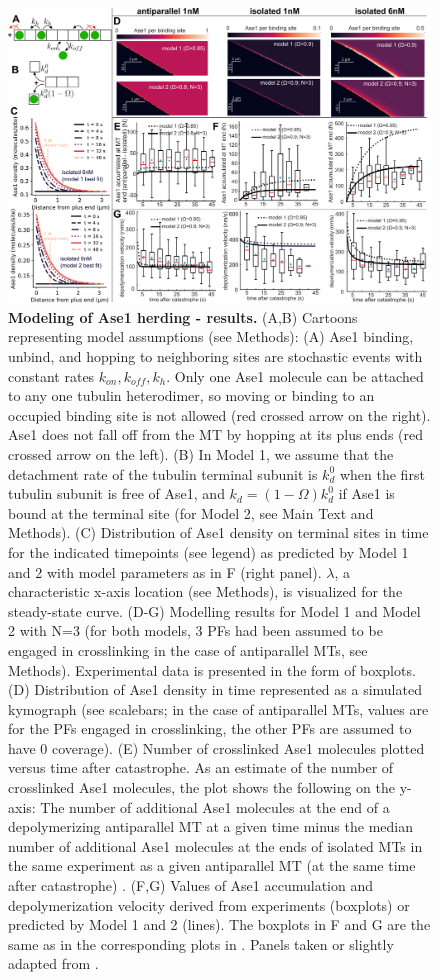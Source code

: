 \begin{figure}[h!]
    \centering
    \includegraphics[width=1\linewidth]{Figures/ase2d.png}
    \caption[Modeling of Ase1 herding - results.]{\textbf{Modeling of Ase1 herding - results.}
    (A,B) Cartoons representing model assumptions (see Methods): (A) Ase1 binding, unbind, and hopping to neighboring sites are stochastic events with constant rates $k_{on},k_{off},k_h$. Only one Ase1 molecule can be attached to any one tubulin heterodimer, so moving or binding to an occupied binding site is not allowed (red crossed arrow on the right). Ase1 does not fall off from the MT by hopping at its plus ends (red crossed arrow on the left). (B) In Model 1, we assume that the detachment rate of the tubulin terminal subunit is $k_d^0$ when the first tubulin subunit is free of Ase1, and $k_d=(1-\Omega)k_d^0$ if Ase1 is bound at the terminal site (for Model 2, see Main Text and Methods). (C) Distribution of Ase1 density on terminal sites in time for the indicated timepoints (see legend) as predicted by Model 1 and 2 with model parameters as in F (right panel). $\lambda$, a characteristic x-axis location (see Methods), is visualized for the steady-state curve. (D-G) Modelling results for Model 1 and Model 2 with N=3 (for both models, 3 PFs had been assumed to be engaged in crosslinking in the case of antiparallel MTs, see Methods). Experimental data is presented in the form of boxplots. (D) Distribution of Ase1 density in time represented as a simulated kymograph (see scalebars; in the case of antiparallel MTs, values are for the PFs engaged in crosslinking, the other PFs are assumed to have 0 coverage). (E) Number of crosslinked Ase1 molecules plotted versus time after catastrophe. As an estimate of the number of crosslinked Ase1 molecules, the plot shows the following on the y-axis: The number of additional Ase1 molecules at the end of a depolymerizing antiparallel MT at a given time  minus the median number of additional Ase1 molecules at the ends of isolated MTs in the same experiment as a given antiparallel MT (at the same time after catastrophe) . (F,G) Values of Ase1 accumulation and depolymerization velocity derived from experiments (boxplots) or predicted by Model 1 and 2 (lines). The boxplots in F and G are the same as in the corresponding plots in . Panels taken or slightly adapted from \cite{Krattenmacher2024}.
}
\end{figure}
